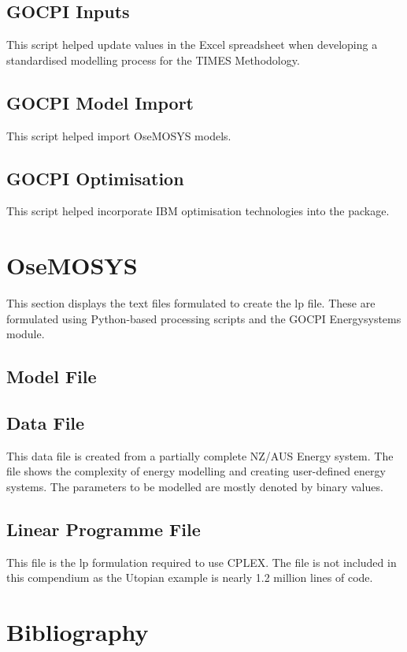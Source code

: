 \documentclass[12pt]{article}
\begin{document}
\subsection{GOCPI Inputs}
This script helped update values in the Excel spreadsheet when developing a standardised modelling process for the TIMES Methodology.

\subsection{GOCPI Model Import}
This script helped import OseMOSYS models.

\subsection{GOCPI Optimisation}
This script helped incorporate IBM optimisation technologies into the package.

\newpage

\section{OseMOSYS}
This section displays the text files formulated to create the lp file.
These are formulated using Python-based processing scripts and the GOCPI Energysystems module.
\subsection{Model File}

\subsection{Data File}
This data file is created from a partially complete NZ/AUS Energy system.
The file shows the complexity of energy modelling and creating user-defined energy systems.
The parameters to be modelled are mostly denoted by binary values.

\subsection{Linear Programme File}
This file is the lp formulation required to use CPLEX.
The file is not included in this compendium as the Utopian example is nearly 1.2 million lines of code.
\newpage

\section{Bibliography}
\printbibliography
\end{document}
